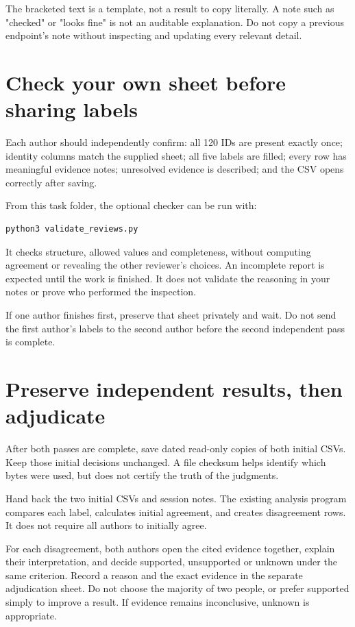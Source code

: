 \documentclass[11pt,a4paper]{article}
\begin{document}
The bracketed text is a template, not a result to copy literally. A note such as "checked" or "looks fine" is not an auditable explanation. Do not copy a previous endpoint's note without inspecting and updating every relevant detail.


\section{Check your own sheet before sharing labels}


Each author should independently confirm: all 120 IDs are present exactly once; identity columns match the supplied sheet; all five labels are filled; every row has meaningful evidence notes; unresolved evidence is described; and the CSV opens correctly after saving.


From this task folder, the optional checker can be run with:


\begin{lstlisting}
python3 validate_reviews.py
\end{lstlisting}


It checks structure, allowed values and completeness, without computing agreement or revealing the other reviewer's choices. An incomplete report is expected until the work is finished. It does not validate the reasoning in your notes or prove who performed the inspection.


If one author finishes first, preserve that sheet privately and wait. Do not send the first author's labels to the second author before the second independent pass is complete.


\section{Preserve independent results, then adjudicate}


After both passes are complete, save dated read-only copies of both initial CSVs. Keep those initial decisions unchanged. A file checksum helps identify which bytes were used, but does not certify the truth of the judgments.


Hand back the two initial CSVs and session notes. The existing analysis program compares each label, calculates initial agreement, and creates disagreement rows. It does not require all authors to initially agree.


For each disagreement, both authors open the cited evidence together, explain their interpretation, and decide supported, unsupported or unknown under the same criterion. Record a reason and the exact evidence in the separate adjudication sheet. Do not choose the majority of two people, or prefer supported simply to improve a result. If evidence remains inconclusive, unknown is appropriate.
\end{document}
